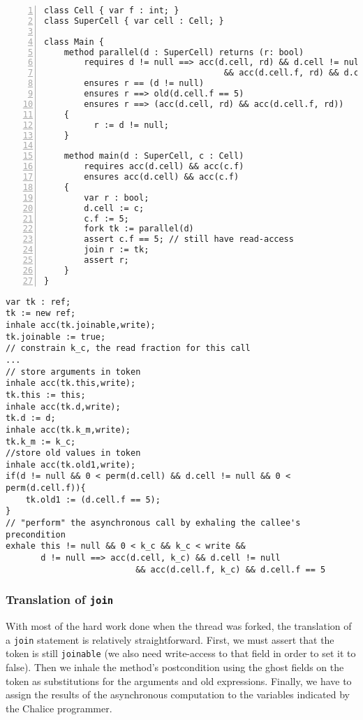 \begin{lstlisting}[float,caption={Example of Chalice program featuring fork and join of method with a possibly undefined \lstinline!old! expression.},label=lst:fjexample,language=chalice,numbers=left]
class Cell { var f : int; }
class SuperCell { var cell : Cell; }

class Main {
    method parallel(d : SuperCell) returns (r: bool)
        requires d != null ==> acc(d.cell, rd) && d.cell != null 
				                    && acc(d.cell.f, rd) && d.cell.f == 5
        ensures r == (d != null)
        ensures r ==> old(d.cell.f == 5)
        ensures r ==> (acc(d.cell, rd) && acc(d.cell.f, rd))
    {
          r := d != null;
    }

    method main(d : SuperCell, c : Cell)
        requires acc(d.cell) && acc(c.f)
        ensures acc(d.cell) && acc(c.f)
    {
        var r : bool;
        d.cell := c;
        c.f := 5;
        fork tk := parallel(d)
        assert c.f == 5; // still have read-access
        join r := tk;
        assert r;
    }
}
\end{lstlisting}

\begin{lstlisting}[float,caption={Translation of the \lstinline!fork! statement on line 22 in listing \ref{lst:fjexample}.},label=lst:fjexamplefork,language=sil]
var tk : ref;
tk := new ref;
inhale acc(tk.joinable,write);
tk.joinable := true;
// constrain k_c, the read fraction for this call 
...
// store arguments in token
inhale acc(tk.this,write);
tk.this := this;
inhale acc(tk.d,write);
tk.d := d;
inhale acc(tk.k_m,write);
tk.k_m := k_c;
//store old values in token
inhale acc(tk.old1,write);
if(d != null && 0 < perm(d.cell) && d.cell != null && 0 < perm(d.cell.f)){
	tk.old1 := (d.cell.f == 5);
}
// "perform" the asynchronous call by exhaling the callee's precondition
exhale this != null && 0 < k_c && k_c < write &&
       d != null ==> acc(d.cell, k_c) && d.cell != null 
				          && acc(d.cell.f, k_c) && d.cell.f == 5
\end{lstlisting}
 
\subsubsection{Translation of \lstinline!join!}\label{sct:fjjoin}
With most of the hard work done when the thread was forked, the translation of a \lstinline!join! statement is relatively straightforward.
First, we must assert that the token is still \lstinline!joinable! (we also need write-access to that field in order to set it to false). 
Then we inhale the method's postcondition using the ghost fields on the token as substitutions for the arguments and old expressions. 
Finally, we have to assign the results of the asynchronous computation to the variables indicated by the Chalice programmer.

